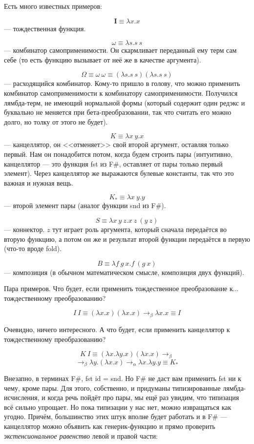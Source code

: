 \documentclass{../../text-style}
\begin{document}
Есть много известных примеров:

$$\textbf{I} \equiv \lambda x.x$$
--- тождественная функция.

$$\omega \equiv \lambda s.s\ s$$
--- комбинатор самоприменимости. Он скармливает переданный ему терм сам себе (то есть функцию вызывает от неё же в качестве аргумента).

$$\Omega \equiv \omega\ \omega \equiv (\lambda s.s\ s) (\lambda s.s\ s)$$
--- расходящийся комбинатор. Кому-то пришло в голову, что можно применить комбинатор самоприменимости к комбинатору самоприменимости. Получился лямбда-терм, не имеющий нормальной формы (который содержит один редэкс и буквально не меняется при бета-преобразовании, так что считать его можно долго, но толку от этого не будет).

$$K \equiv \lambda x\ y.x$$
--- канцеллятор, он <<отменяет>> свой второй аргумент, оставляя только первый. Нам он понадобится потом, когда будем строить пары (интуитивно, канцеллятор --- это функция fst из F\#, оставляет от пары только первый элемент). Через канцеллятор же выражаются булевые константы, так что это важная и нужная вещь.

$$K_\ast \equiv \lambda x\ y.y$$
--- второй элемент пары (аналог функции snd из F\#).

$$S \equiv \lambda x\ y\ z. x\ z\ (y\ z)$$
--- коннектор. $z$ тут играет роль аргумента, который сначала передаётся во вторую функцию, а потом он же и результат второй функции передаётся в первую (что-то вроде fold).

$$B \equiv \lambda f\ g\ x. f\ (g\ x)$$
--- композиция (в обычном математическом смысле, композиция двух функций).

Пара примеров. Что будет, если применить тождественное преобразование к... тождественному преобразованию?

$$I\ I \equiv (\lambda x.x) (\lambda x.x) \rightarrow_\beta \lambda x.x \equiv I$$

Очевидно, ничего интересного. А что будет, если применить канцеллятор к тождественному преобразованию?

$$K\ I \equiv (\lambda x.\lambda y.x) (\lambda x.x) \rightarrow_\beta $$
$$\rightarrow_\beta \lambda y.(\lambda x.x) \rightarrow_\alpha \lambda x.\lambda y.y \equiv K_\ast$$

Внезапно, в терминах F\#, fst id = snd. Но F\# не даст вам применить fst ни к чему, кроме пары. Для этого, собственно, и придуманы типизированные лямбда-исчисления, и когда речь пойдёт про пары, мы ещё раз увидим, что типизация всё сильно упрощает. Но пока типизации у нас нет, можно извращаться как угодно. Причём, большинство этих штук вполне будет работать и в F\# --- канцеллятор можно объявить как генерик-функцию и прямо проверить \textit{экстенсиональное равенство} левой и правой части:
\end{document}
